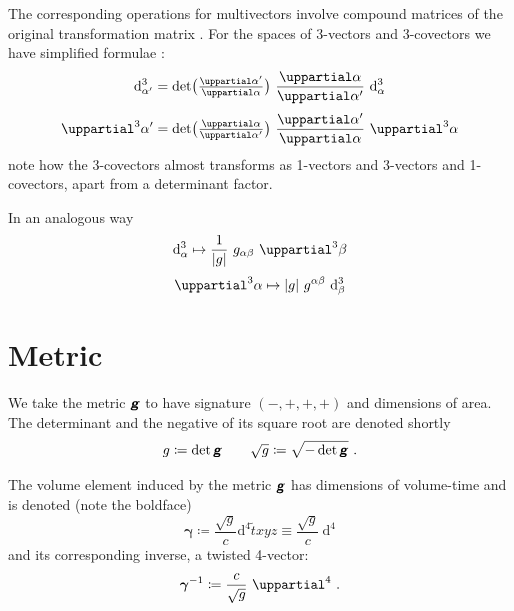 \documentclass[\ifafour a4paper,12pt,\else a5paper,10pt,\fi%
onecolumn,oneside,article,%
british%
]{memoir}
\theoremstyle{remark}
\theoremstyle{innote}
\newcommand*{\mathte}[1]{\textbf{\textit{\textsf{#1}}}}
\newcommand*{\de}{\uppartial}%
\newcommand*{\di}{\mathrm{d}}%
\newcommand*{\defd}{\coloneqq}
\DeclarePairedDelimiter\abs{\lvert}{\rvert}
\renewcommand*{\|}[1][]{\nonscript\:#1\vert\nonscript\:\mathopen{}}
\newcommand*{\sect}{\S}%
\newcommand*{\eqn}{eq.}%
\newcommand*{\ssssi}[1]{\di^{4}{#1}}
\newcommand*{\tw}[1]{\tilde{#1}}
\newcommand*{\ttte}[1]{\de^{3}{#1}}
\newcommand*{\tttte}[1]{\de^{4}{#1}}
\newcommand*{\ttti}[1]{\di^{3}_{#1}}
\newcommand*{\tttti}[1]{\di^{4}_{#1}}
\newcommand*{\yg}{\mathte{g}}
\newcommand*{\dg}{\sqrt{g}}
\newcommand*{\ve}{\bm{\gamma}}
\newcommand*{\vi}{\bm{\gamma}^{-1}}
\begin{document}
The corresponding operations for multivectors involve {compound matrices} of the original transformation matrix \autocites[\sect~IV.A.1 p.~199]{choquetbruhatetal1977_r1996}. For the spaces of 3-vectors and 3-covectors we have simplified formulae \autocites[\sect~I.4 \eqn~(33)]{gantmacher1959_r2000}:
\begin{equation}
  \label{eq:transf3_simple}
  \begin{gathered}
    \ttti{\alpha'} =
    \det\bigl(
    \tfrac{\de \alpha'}{\de \alpha}
    \bigr)
    \ 
    \frac{\de \alpha}{\de \alpha'}
    \ 
    \ttti{\alpha}
    \\[\jot]
    \ttte{\alpha'} =
    \det\bigl(
    \tfrac{\de \alpha}{\de \alpha'}
    \bigr)
    \ 
    \frac{\de \alpha'}{\de \alpha}
    \ 
    \ttte{\alpha}
  \end{gathered}
\end{equation}
note how the 3-covectors almost transforms as 1-vectors and 3-vectors and 1-covectors, apart from a determinant factor.

In an analogous way
\begin{equation}
  \label{eq:raise3_simple}
  \begin{gathered}
    \ttti{\alpha}
    \mapsto
\frac{1}{\abs{g}}\ g_{\alpha\beta}\
    \ttte{\beta}
    \\[\jot]
    \ttte{\alpha}
    \mapsto
\abs{g}\ g^{\alpha\beta}\
    \ttti{\beta}
  \end{gathered}
\end{equation}


\section{Metric}
\label{sec:metric}

We take the metric $\yg$ to have signature $(-,+,+,+)$ and dimensions of area. The determinant and the negative of its square root are denoted shortly
\begin{equation}
  \label{eq:det_g}
  g\defd \det\yg
  \qquad
\dg \defd \sqrt{-\det\yg} \ .
\end{equation}

The volume element induced by the metric $\yg$ has dimensions of volume-time and is denoted (note the boldface)
\begin{equation}
  \label{eq:vol_element}
  \ve \defd \frac{\dg}{c} \ssssi{\tw{t}xyz} \equiv \frac{\dg}{c}\ \tttti{}
\end{equation}
and its corresponding inverse, a twisted 4-vector:
\begin{equation}
  \label{eq:inv_vol_element}
  \vi \defd \frac{c}{\dg}\ \tttte{} \ .
\end{equation}
\end{document}
